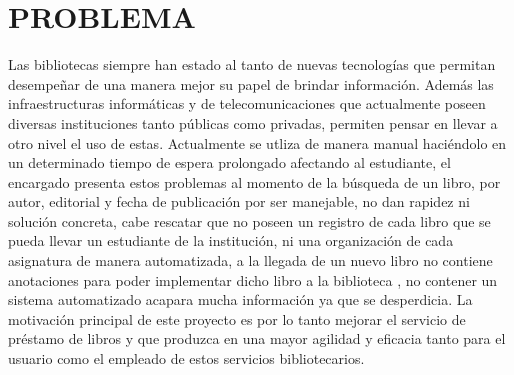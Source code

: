 \section{PROBLEMA} 

\begin{enumerate}[1.]
    
    Las bibliotecas siempre han estado al tanto de nuevas tecnologías que permitan desempeñar de una manera mejor su papel de brindar información. Además las infraestructuras informáticas y de telecomunicaciones que actualmente poseen diversas instituciones tanto públicas como privadas, permiten pensar en llevar a otro nivel el uso de estas.
    Actualmente se utliza de manera manual haciéndolo en un determinado tiempo de espera prolongado afectando al estudiante, el encargado presenta estos problemas al momento de la búsqueda de un libro, por autor, editorial y fecha de publicación por ser manejable, no dan rapidez ni solución concreta, cabe rescatar que no poseen un registro de cada libro que se pueda llevar un estudiante de la institución, ni una organización de cada asignatura de manera automatizada, a la llegada de un nuevo libro no contiene anotaciones para poder implementar dicho libro a la biblioteca , no contener un sistema automatizado acapara mucha información ya que se desperdicia.
La motivación principal de este proyecto es por lo tanto mejorar el servicio de préstamo de libros y que produzca en una mayor agilidad y eficacia tanto para el usuario como el empleado de estos servicios bibliotecarios.


\end{enumerate} 
